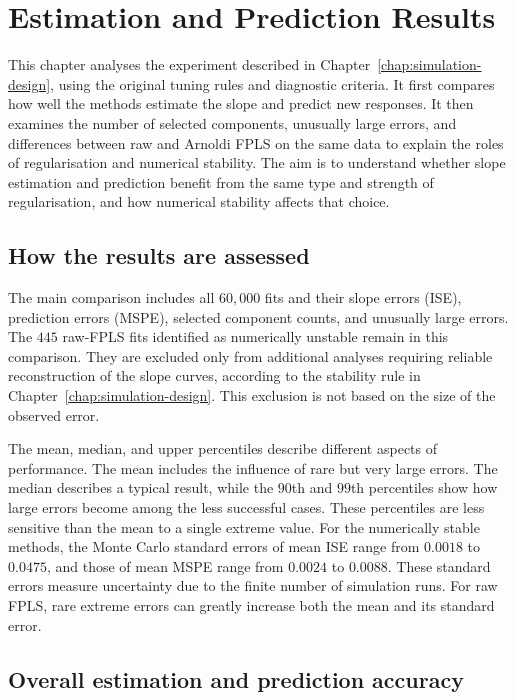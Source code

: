 \chapter{Estimation and Prediction Results}
\label{chap:estimation-results}

This chapter analyses the experiment described in
Chapter~\ref{chap:simulation-design}, using the original tuning rules and
diagnostic criteria. It first compares how well the methods estimate the slope
and predict new responses. It then examines the number of selected components,
unusually large errors, and differences between raw and Arnoldi FPLS on the
same data to explain the roles of regularisation and numerical stability. The
aim is to understand whether slope estimation and prediction benefit from the
same type and strength of regularisation, and how numerical stability affects
that choice.

\section{How the results are assessed}
\label{sec:results-verification}

The main comparison includes all $60{,}000$ fits and their slope errors (ISE),
prediction errors (MSPE), selected component counts, and unusually large
errors. The $445$ raw-FPLS fits identified as numerically unstable remain in
this comparison. They are excluded only from additional analyses requiring
reliable reconstruction of the slope curves, according to the stability rule
in Chapter~\ref{chap:simulation-design}. This exclusion is not based on the
size of the observed error.

The mean, median, and upper percentiles describe different aspects of
performance. The mean includes the influence of rare but very large errors.
The median describes a typical result, while the $90$th and $99$th percentiles
show how large errors become among the less successful cases. These
percentiles are less sensitive than the mean to a single extreme value.
For the numerically stable methods, the Monte Carlo standard errors of mean
ISE range from $0.0018$ to $0.0475$, and those of mean MSPE range from
$0.0024$ to $0.0088$. These standard errors measure uncertainty due to the
finite number of simulation runs. For raw FPLS, rare extreme errors can
greatly increase both the mean and its standard error.

\section{Overall estimation and prediction accuracy}
\label{sec:results-overall-accuracy}

